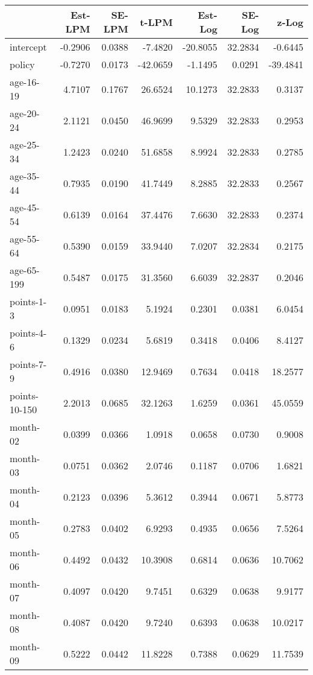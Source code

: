 \documentclass[10pt]{article}
\begin{document}
\begin{table}[ht]
\centering
\begin{tabular}{lrrrrrr}
  \hline
 & Est-LPM & SE-LPM & t-LPM & Est-Log & SE-Log & z-Log \\ 
  \hline
intercept & -0.2906 & 0.0388 & -7.4820 & -20.8055 & 32.2834 & -0.6445 \\ 
  policy & -0.7270 & 0.0173 & -42.0659 & -1.1495 & 0.0291 & -39.4841 \\ 
  age-16-19 & 4.7107 & 0.1767 & 26.6524 & 10.1273 & 32.2833 & 0.3137 \\ 
  age-20-24 & 2.1121 & 0.0450 & 46.9699 & 9.5329 & 32.2833 & 0.2953 \\ 
  age-25-34 & 1.2423 & 0.0240 & 51.6858 & 8.9924 & 32.2833 & 0.2785 \\ 
  age-35-44 & 0.7935 & 0.0190 & 41.7449 & 8.2885 & 32.2833 & 0.2567 \\ 
  age-45-54 & 0.6139 & 0.0164 & 37.4476 & 7.6630 & 32.2833 & 0.2374 \\ 
  age-55-64 & 0.5390 & 0.0159 & 33.9440 & 7.0207 & 32.2834 & 0.2175 \\ 
  age-65-199 & 0.5487 & 0.0175 & 31.3560 & 6.6039 & 32.2837 & 0.2046 \\ 
  points-1-3 & 0.0951 & 0.0183 & 5.1924 & 0.2301 & 0.0381 & 6.0454 \\ 
  points-4-6 & 0.1329 & 0.0234 & 5.6819 & 0.3418 & 0.0406 & 8.4127 \\ 
  points-7-9 & 0.4916 & 0.0380 & 12.9469 & 0.7634 & 0.0418 & 18.2577 \\ 
  points-10-150 & 2.2013 & 0.0685 & 32.1263 & 1.6259 & 0.0361 & 45.0559 \\ 
  month-02 & 0.0399 & 0.0366 & 1.0918 & 0.0658 & 0.0730 & 0.9008 \\ 
  month-03 & 0.0751 & 0.0362 & 2.0746 & 0.1187 & 0.0706 & 1.6821 \\ 
  month-04 & 0.2123 & 0.0396 & 5.3612 & 0.3944 & 0.0671 & 5.8773 \\ 
  month-05 & 0.2783 & 0.0402 & 6.9293 & 0.4935 & 0.0656 & 7.5264 \\ 
  month-06 & 0.4492 & 0.0432 & 10.3908 & 0.6814 & 0.0636 & 10.7062 \\ 
  month-07 & 0.4097 & 0.0420 & 9.7451 & 0.6329 & 0.0638 & 9.9177 \\ 
  month-08 & 0.4087 & 0.0420 & 9.7240 & 0.6393 & 0.0638 & 10.0217 \\ 
  month-09 & 0.5222 & 0.0442 & 11.8228 & 0.7388 & 0.0629 & 11.7539 \\ 

\end{tabular}
\end{table}
\end{document}
